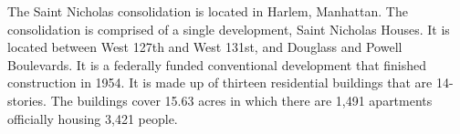 The Saint Nicholas consolidation is located in Harlem, Manhattan. The consolidation is comprised of a single development, Saint Nicholas Houses. It is located between West 127th and West 131st, and Douglass and Powell Boulevards. It is a federally funded conventional development that finished construction in 1954. It is made up of thirteen residential buildings that are 14-stories. The buildings cover 15.63 acres in which there are 1,491 apartments officially housing 3,421 people.